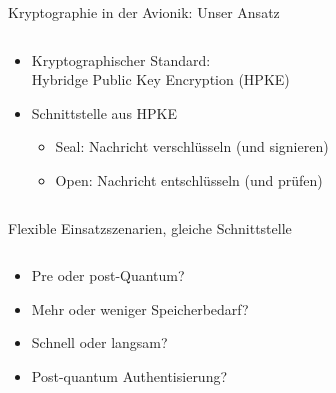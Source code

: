 \begin{frame}[c]{Kryptographie in der Avionik: Unser Ansatz}
  \begin{columns}[fullwidth,c]
    \begin{column}{.65\linewidth}
      \begin{itemize}
        \item Kryptographischer Standard:\\
        Hybridge Public Key Encryption (HPKE)
        \item Schnittstelle aus HPKE
        \begin{itemize}
          \item Seal: Nachricht verschlüsseln (und signieren)
          \item Open: Nachricht entschlüsseln (und prüfen)
        \end{itemize}
      \end{itemize}
    \end{column}%
    \hfill
  \end{columns}
\end{frame}


\begin{frame}[c]{Flexible Einsatzszenarien, gleiche Schnittstelle}
  \begin{columns}[fullwidth,c]
  \hfill
    \begin{column}{.35\linewidth}
      \begin{itemize}
        \item Pre oder post-Quantum?
        \item Mehr oder weniger Speicherbedarf?
        \item Schnell oder langsam?
        \item Post-quantum Authentisierung? 
      \end{itemize}
    \end{column}%
  \end{columns}
\end{frame}


